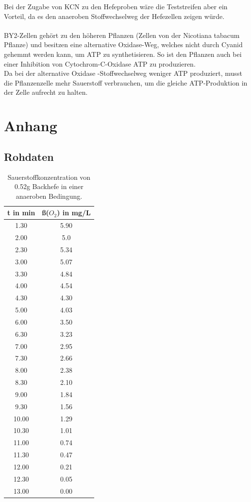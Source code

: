 \documentclass[10pt,a4paper]{article}
\begin{document}
	Bei der Zugabe von KCN zu den Hefeproben wäre die Teststreifen aber ein Vorteil, da es den anaeroben Stoffwechselweg der Hefezellen zeigen würde.\\
	\\
	BY2-Zellen gehört zu den höheren Pflanzen (Zellen von der Nicotiana tabacum Pflanze) und besitzen eine alternative Oxidase-Weg, welches nicht durch Cyanid gehemmt werden kann, um ATP zu synthetisieren. So ist den Pflanzen auch bei einer Inhibition von Cytochrom-C-Oxidase ATP zu produzieren.\\
	Da bei der alternative Oxidase -Stoffwechselweg weniger ATP produziert, musst die Pflanzenzelle mehr Sauerstoff verbrauchen, um die gleiche ATP-Produktion in der Zelle aufrecht zu halten.\\
	
	\section{Anhang}
	\subsection{Rohdaten}
	
	\begin{table}[H]
		\centering
		\caption{Sauerstoffkonzentration von 0.52g Backhefe in einer anaeroben Bedingung.}
		\label{tab:O2 Backhefe ohne KCN}
		\begin{tabular}{cc}
			\toprule
			t in min& ß($O_2$) in mg/L\\
			\midrule
			1.30 & 5.90\\
			2.00 & 5.0\\
			2.30 & 5.34\\
			3.00 & 5.07\\
			3.30 & 4.84 \\
			4.00 & 4.54 \\
			4.30 & 4.30 \\
			5.00 & 4.03 \\
			6.00 & 3.50 \\
			6.30 & 3.23\\
			7.00 & 2.95\\
			7.30 & 2.66\\
			8.00 & 2.38\\
			8.30 & 2.10 \\
			9.00 & 1.84\\
			9.30 & 1.56 \\
			10.00 & 1.29\\
			10.30 & 1.01\\
			11.00 & 0.74\\
			11.30 & 0.47\\
			12.00 & 0.21\\
			12.30 & 0.05\\
			13.00 & 0.00\\			
			\bottomrule
		\end{tabular}
	\end{table}	
	
\end{document}
